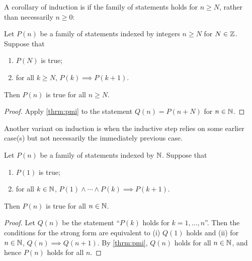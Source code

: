 A corollary of induction is if the family of statements holds for $n\ge N$, rather than necessarily $n\ge0$:

\begin{corollary}
Let $P(n)$ be a family of statements indexed by integers $n \ge N$ for $N\in\mathbb Z$. Suppose that 
\begin{enumerate}[label=(\roman*)]
\item $P(N)$ is true;
\item for all $k \ge N$, $P(k) \implies P(k+1)$. 
\end{enumerate}
Then $P(n)$ is true for all $n \ge N$.
\end{corollary}

\begin{proof}
Apply \cref{thrm:pmi} to the statement $Q(n)=P(n+N)$ for $n\in\mathbb N$.
\end{proof}

Another variant on induction is when the inductive step relies on some earlier case(s) but not necessarily the immediately previous case.

\begin{theorem}\label{thrm:strong-induction}
Let $P(n)$ be a family of statements indexed by $\mathbb N$. Suppose that
\begin{enumerate}[label=(\roman*)]
\item $P(1)$ is true;
\item for all $k\in\mathbb N$, $P(1)\land\cdots\land P(k)\implies P(k+1)$.
\end{enumerate}
Then $P(n)$ is true for all $n\in\mathbb N$.
\end{theorem}

\begin{proof}
Let $Q(n)$ be the statement ``$P(k)$ holds for $k=1,\dots,n$''. Then the conditions for the strong form are equivalent to (i) $Q(1)$ holds and (ii) for $n\in\mathbb N$, $Q(n)\implies Q(n+1)$. By \cref{thrm:pmi}, $Q(n)$ holds for all $n\in\mathbb N$, and hence $P(n)$ holds for all $n$.
\end{proof}

